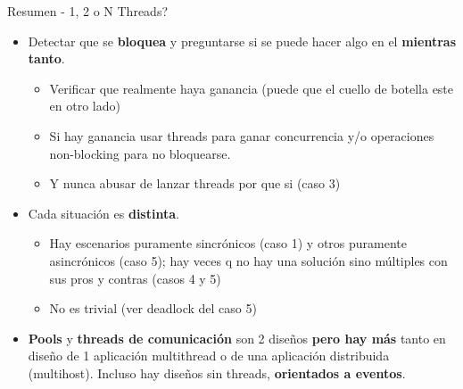 \begin{frame}[fragile]{Resumen - 1, 2 o N Threads?}
   \begin{itemize}
       \item<1-> Detectar que se \textbf{bloquea} y preguntarse si se puede hacer algo en el \textbf{mientras tanto}.
       \begin{itemize}
           \item<2-> Verificar que realmente haya ganancia (puede que el cuello de botella este en otro lado)
           \item<2-> Si hay ganancia usar threads para ganar concurrencia y/o operaciones non-blocking para no bloquearse.
           \item<2-> Y nunca abusar de lanzar threads por que si (caso 3)
       \end{itemize}
   \item<3-> Cada situaci\'on es \textbf{distinta}.
       \begin{itemize}
           \item<4-> Hay escenarios puramente sincr\'onicos (caso 1) y otros puramente asincr\'onicos (caso 5); hay veces q no hay una soluci\'on sino m\'ultiples con sus pros y contras (casos 4 y 5)
           \item<4-> No es trivial (ver deadlock del caso 5)
       \end{itemize}
   \item<5-> \textbf{Pools} y \textbf{threads de comunicaci\'on} son 2 dise\~nos \textbf{pero hay m\'as} tanto en dise\~no de 1 aplicaci\'on multithread o de una aplicaci\'on distribuida (multihost). Incluso hay dise\~nos sin threads, \textbf{orientados a eventos}.
   \end{itemize}
\end{frame}

